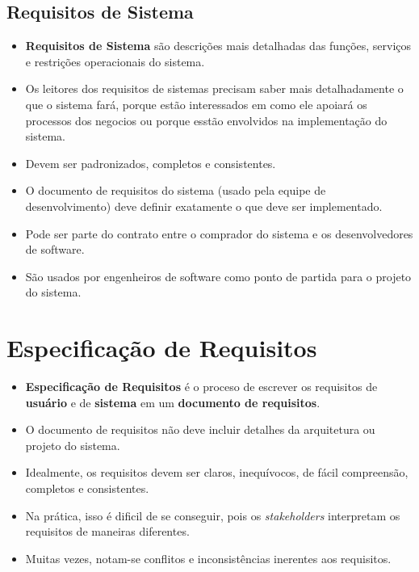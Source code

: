 \documentclass[a4paper, 11pt]{article}
\begin{document}
\subsection{Requisitos de Sistema}
\begin{itemize}
    \item \textbf{Requisitos de Sistema} são descrições mais detalhadas das funções, serviços e restrições operacionais do sistema.
    \item Os leitores dos requisitos de sistemas precisam saber mais detalhadamente o que o sistema fará, porque estão interessados em como ele apoiará
    os processos dos negocios ou porque esstão envolvidos na implementação do sistema.
    \item Devem ser padronizados, completos e consistentes. 
    \item O documento de requisitos do sistema (usado pela equipe de desenvolvimento) deve definir exatamente o que deve ser implementado. 
    \item Pode ser parte do contrato entre o comprador do sistema e os desenvolvedores de software.
	\item São usados por engenheiros de software como ponto de partida para o projeto do sistema.
\end{itemize}

\section{Especificação de Requisitos}
\begin{itemize}
    \item \textbf{Especificação de Requisitos} é o proceso de escrever os requisitos de \textbf{usuário} e de \textbf{sistema} em um \textbf{documento de requisitos}.
	\item O documento de requisitos não deve incluir detalhes da arquitetura ou projeto do sistema.
	\item Idealmente, os requisitos devem ser claros, inequívocos, de fácil compreensão, completos e consistentes.
	\item Na prática, isso é dificil de se conseguir, pois os \textit{stakeholders} interpretam os requisitos de maneiras diferentes.
	\item Muitas vezes, notam-se conflitos e inconsistências inerentes aos requisitos.
\end{itemize}
\end{document}
